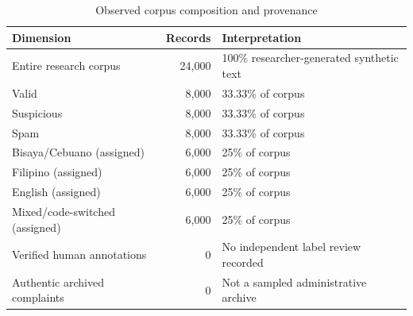 \begin{table}[H]\centering\caption{Observed corpus composition and provenance}\label{tab:m1composition}\small
\begin{tabularx}{\textwidth}{p{}rX}\toprule
\textbf{Dimension} & \textbf{Records} & \textbf{Interpretation}\\\midrule
Entire research corpus & 24,000 & 100\% researcher-generated synthetic text\\
Valid & 8,000 & 33.33\% of corpus\\
Suspicious & 8,000 & 33.33\% of corpus\\
Spam & 8,000 & 33.33\% of corpus\\
Bisaya/Cebuano (assigned) & 6,000 & 25\% of corpus\\
Filipino (assigned) & 6,000 & 25\% of corpus\\
English (assigned) & 6,000 & 25\% of corpus\\
Mixed/code-switched (assigned) & 6,000 & 25\% of corpus\\
Verified human annotations & 0 & No independent label review recorded\\
Authentic archived complaints & 0 & Not a sampled administrative archive\\\bottomrule
\end{tabularx}\end{table}

